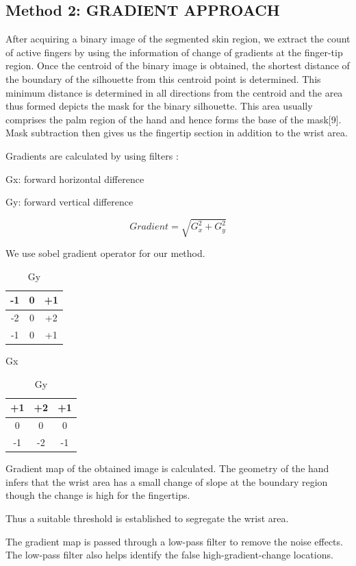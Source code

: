 \documentclass[conference]{IEEEtran}
\begin{document}
\subsection{Method 2: GRADIENT APPROACH}
After acquiring a binary image of the segmented skin region, we extract the count of active fingers by using the information of change of gradients at the finger-tip region.
Once the centroid of the binary image is obtained, the shortest distance of the boundary of the silhouette from this centroid point is determined. This minimum distance is determined in all directions from the centroid and the area thus formed depicts the mask for the binary silhouette. This area usually comprises the palm region of the hand and hence forms the base of the mask[9]. Mask subtraction then gives us the fingertip section in addition to the wrist area.

Gradients are calculated by using filters :

Gx: forward horizontal difference 

Gy: forward vertical difference

\[
     Gradient = \sqrt{G_x^2 + G_y^2} 
\]

We use sobel gradient operator for our method.
\begin{table}
\parbox{.45\linewidth}{
\centering
\begin{tabular}{|c|c|c|}
\hline
-1&0&+1\\ \hline
-2&0&+2\\ \hline
-1&0&+1\\ \hline
\end{tabular}
\caption{Gx}
}
\hfill
\parbox{.45\linewidth}{
\centering
\begin{tabular}{|c|c|c|}
\hline
+1&+2&+1\\ \hline
0&0&0\\ \hline
-1&-2&-1\\ \hline
\end{tabular}
\caption{Gy}
}
\end{table}

Gradient map of the obtained image is calculated. The geometry of the hand infers that the wrist area has a small change of slope at the boundary region though the change is high for the fingertips.

Thus a suitable threshold is established to segregate the wrist area.

The gradient map is passed through a low-pass filter to remove the noise effects. The low-pass filter also helps identify the false high-gradient-change locations.
\end{document}
